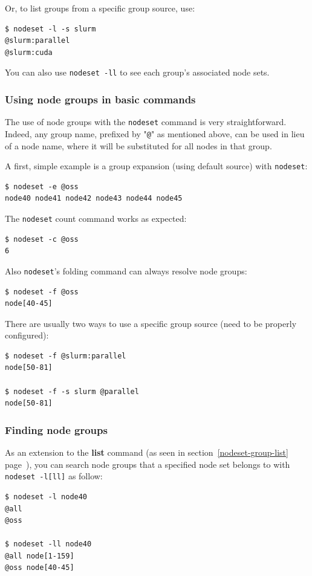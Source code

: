 \documentclass[english,a4paper]{csuserguide}
\newcommand{\nodeset}{\texttt{nodeset}\xspace}
\begin{document}
Or, to list groups from a specific group source, use:
\medskip
\begin{lstlisting}[breaklines=true, breakatwhitespace=true]
$ nodeset -l -s slurm
@slurm:parallel
@slurm:cuda
\end{lstlisting}

You can also use \lstinline+nodeset -ll+ to see each group's associated node sets.

\subsubsection{Using node groups in basic commands}

The use of node groups with the \nodeset command is very straightforward. Indeed, any group name, prefixed by "\verb+@+" as mentioned above, can be used in lieu of a node name, where it will be substituted for all nodes in that group.

A first, simple example is a group expansion (using default source) with \nodeset:
\medskip
\begin{lstlisting}[breaklines=true, breakatwhitespace=true]
$ nodeset -e @oss
node40 node41 node42 node43 node44 node45
\end{lstlisting}

The \nodeset count command works as expected:
\medskip
\begin{lstlisting}[breaklines=true, breakatwhitespace=true]
$ nodeset -c @oss
6
\end{lstlisting}

Also \nodeset's folding command can always resolve node groups:
\medskip
\begin{lstlisting}[breaklines=true, breakatwhitespace=true]
$ nodeset -f @oss
node[40-45]
\end{lstlisting}

There are usually two ways to use a specific group source (need to be properly configured):
\medskip
\begin{lstlisting}[breaklines=true, breakatwhitespace=true]
$ nodeset -f @slurm:parallel
node[50-81]

$ nodeset -f -s slurm @parallel
node[50-81]
\end{lstlisting}

\pagebreak[4]

\subsubsection{Finding node groups}
\label{nodeset-group-finding}
As an extension to the \textbf{list} command (as seen in section~\ref{nodeset-group-list} page~\pageref{nodeset-group-list}), you can search node groups that a specified node set belongs to with \lstinline+nodeset -l[ll]+ as follow:
\medskip
\begin{lstlisting}[breaklines=true, breakatwhitespace=true]
$ nodeset -l node40
@all
@oss

$ nodeset -ll node40
@all node[1-159]
@oss node[40-45]
\end{lstlisting}
\end{document}
